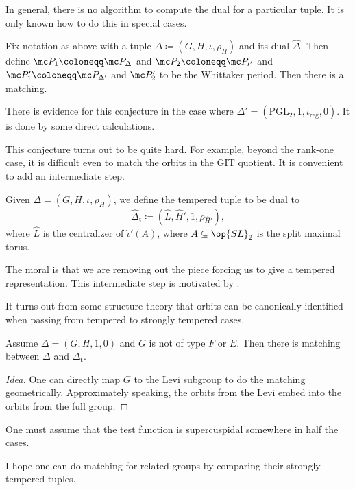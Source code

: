\documentclass{article}
\begin{document}
\begin{remark}
	In general, there is no algorithm to compute the dual for a particular tuple. It is only known how to do this in special cases.
\end{remark}
\begin{conj}
	Fix notation as above with a tuple $\Delta\coloneqq(G,H,\iota,\rho_H)$ and its dual $\widehat\Delta$. Then define $\mc P_1\coloneqq\mc P_\Delta$ and $\mc P_2\coloneqq\mc P_{\iota'}$ and $\mc P_1'\coloneqq\mc P_{\Delta'}$ and $\mc P_2'$ to be the Whittaker period. Then there is a matching.
\end{conj}
\begin{example}
	There is evidence for this conjecture in the case where $\Delta'=(\mathrm{PGL}_2,1,\iota_{\mathrm{reg}},0)$. It is done by some direct calculations.
\end{example}
This conjecture turns out to be quite hard. For example, beyond the rank-one case, it is difficult even to match the orbits in the GIT quotient. It is convenient to add an intermediate step.
\begin{notation}
	Given $\Delta=(G,H,\iota,\rho_H)$, we define the tempered tuple to be dual to
	\[\widehat\Delta_{\mathrm{t}}\coloneqq\left(\widehat L,\widehat H',1,\rho_{\widehat H'}\right),\]
	where $\widehat L$ is the centralizer of $\widehat\iota'(A)$, where $A\subseteq\op{SL}_2$ is the split maximal torus.
\end{notation}
The moral is that we are removing out the piece forcing us to give a tempered representation. This intermediate step is motivated by .
\begin{remark}
	It turns out from some structure theory that orbits can be canonically identified when passing from tempered to strongly tempered cases.
\end{remark}
\begin{theorem}
	Assume $\Delta=(G,H,1,0)$ and $G$ is not of type $F$ or $E$. Then there is matching between $\Delta$ and $\Delta_{\mathrm t}$.
\end{theorem}
\begin{proof}[Idea]
	One can directly map $G$ to the Levi subgroup to do the matching geometrically. Approximately speaking, the orbits from the Levi embed into the orbits from the full group.
\end{proof}
\begin{remark}
	One must assume that the test function is supercuspidal somewhere in half the cases.
\end{remark}
\begin{idea}
	I hope one can do matching for related groups by comparing their strongly tempered tuples.
\end{idea}
\end{document}
